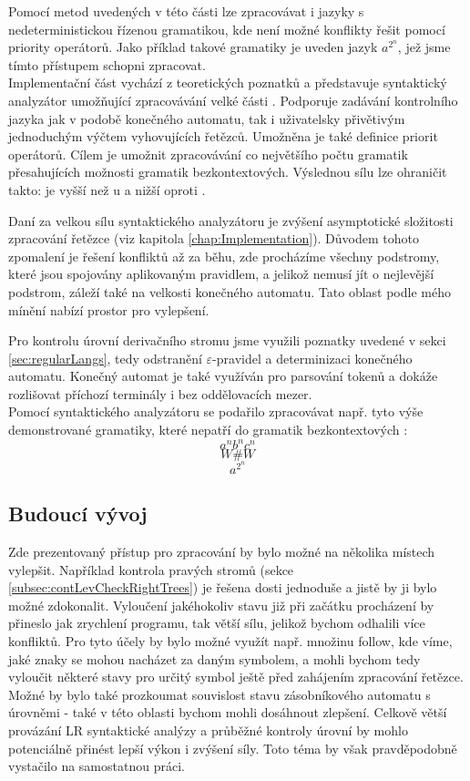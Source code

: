 Pomocí metod uvedených v této části lze zpracovávat i jazyky s nedeterministickou
řízenou gramatikou, kde není možné konflikty řešit pomocí priority operátorů.
Jako příklad takové gramatiky je uveden jazyk $a^{2^n}$, jež jsme tímto přístupem
schopni zpracovat.\\

Implementační část vychází z teoretických poznatků a představuje syntaktický analyzátor
umožňující zpracovávání velké části .
Podporuje zadávání kontrolního jazyka jak v podobě konečného automatu, tak
i uživatelsky přivětivým jednoduchým výčtem vyhovujících řetězců.
Umožněna je také definice priorit operátorů. Cílem je umožnit
zpracovávání co největšího počtu gramatik přesahujících možnosti gramatik bezkontextových.
Výslednou sílu lze ohraničit takto: je vyšší než u 
a nižší oproti .

Daní za velkou sílu syntaktického analyzátoru je zvýšení asymptotické složitosti
zpracování řetězce (viz kapitola \ref{chap:Implementation}). Důvodem tohoto zpomalení
je řešení konfliktů až za běhu, zde procházíme  všechny podstromy, které jsou spojovány aplikovaným pravidlem,
a jelikož nemusí jít o nejlevější podstrom, záleží také na velkosti konečného automatu.
Tato oblast podle mého mínění nabízí prostor pro vylepšení.

Pro kontrolu úrovní derivačního stromu jsme využili poznatky uvedené v sekci
\ref{sec:regularLangs}, tedy odstranění $\varepsilon$-pravidel a determinizaci
konečného automatu. Konečný automat je také využíván pro parsování tokenů
a dokáže rozlišovat příchozí terminály i bez oddělovacích mezer.\\

Pomocí syntaktického analyzátoru se podařilo zpracovávat např. tyto
výše demonstrované gramatiky, které nepatří do gramatik
bezkontextových \cite[str. 29]{Koutny}:
\[ a^nb^nc^n \]
\[ W\#W \]
\[ a^{2^n} \]
\subsection*{Budoucí vývoj}

Zde prezentovaný přístup pro zpracování  by
bylo možné na několika místech vylepšit. Například kontrola pravých stromů
(sekce \ref{subsec:contLevCheckRightTrees}) je řešena dosti jednoduše a jistě by ji bylo možné
zdokonalit.
Vyloučení jakéhokoliv stavu již při začátku procházení by přineslo jak
zrychlení programu, tak větší sílu, jelikož bychom odhalili více konfliktů.
Pro tyto účely by bylo možné využít např. množinu follow, kde víme, jaké znaky se
mohou nacházet za daným symbolem, a mohli bychom tedy vyloučit některé stavy
pro určitý symbol ještě před zahájením zpracování řetězce. Možné by bylo také
prozkoumat souvislost stavu zásobníkového automatu s úrovněmi - také v této oblasti bychom
mohli dosáhnout zlepšení. Celkově větší provázání LR syntaktické
analýzy a průběžné kontroly úrovní by mohlo potenciálně přinést lepší výkon
i zvýšení síly. Toto téma by však pravděpodobně vystačilo na samostatnou práci.\\

